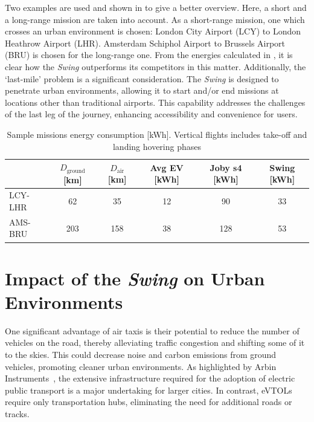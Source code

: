 Two examples are used and shown in  to give a better overview. Here, a short and a long-range mission are taken into account. As a short-range mission, one which crosses an urban environment is chosen: London City Airport (LCY) to London Heathrow Airport (LHR). Amsterdam Schiphol Airport to Brussels Airport (BRU) is chosen for the long-range one. From the energies calculated in , it is clear how the \textit{Swing} outperforms its competitors in this matter. Additionally, the \enquote*{last-mile} problem is a significant consideration. The \textit{Swing} is designed to penetrate urban environments, allowing it to start and/or end missions at locations other than traditional airports. This capability addresses the challenges of the last leg of the journey, enhancing accessibility and convenience for users.


\begin{table}[H]
\caption{Sample missions energy consumption [kWh]. Vertical flights includes take-off and landing hovering phases}
\centering
\begin{tabular}{l|SSSSS}
\textbf{} & \textbf{$D_\text{ground}$ [\unit{km}]}  & \textbf{$D_\text{air}$ [\unit{km}]}  & \textbf{Avg EV [\unit{kWh}]}  & \textbf{Joby s4 [\unit{kWh}]} & \textbf{Swing [\unit{kWh}]}  \\ \toprule
LCY-LHR & 62  & 35  & 12 & 90 & 33    \\ 
AMS-BRU  & 203 & 158 & 38 & 128 & 53   \\ \bottomrule
\end{tabular}
\label{tab:energymissions}
\end{table}


\section{Impact of the \textit{Swing} on Urban Environments}
\label{sec:urbanimpact}
One significant advantage of air taxis is their potential to reduce the number of vehicles on the road, thereby alleviating traffic congestion and shifting some of it to the skies.
This could decrease noise and carbon emissions from ground vehicles, promoting cleaner urban environments.
As highlighted by Arbin Instruments~\cite{UAMSust}, the extensive infrastructure required for the adoption of electric public transport is a major undertaking for larger cities.
In contrast, eVTOLs require only transportation hubs, eliminating the need for additional roads or tracks.

